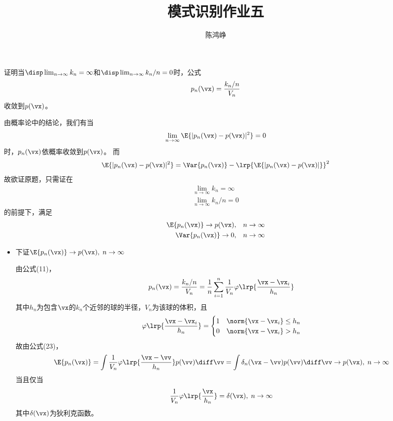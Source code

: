 \documentclass[reportComp]{thesis}
\title{模式识别作业五}
\author{陈鸿峥}
\begin{document}
\maketitle

\begin{question}[\textsection 4 Q5]
证明当$\disp\lim_{n\to\infty}k_n=\infty$和$\disp\lim_{n\to\infty}k_n/n=0$时，公式
\[p_n(\vx)=\frac{k_n/n}{V_n}\]
收敛到$p(\vx)$。
\end{question}
\begin{answer}
由概率论中的结论，我们有当
\[\lim_{n\to \infty}\E{|p_n(\vx)-p(\vx)|^2}=0\]
时，$p_n(\vx)$依概率收敛到$p(\vx)$。
而
\[\E{|p_n(\vx)-p(\vx)|^2}=\Var{p_n(\vx)}-\lrp{\E{|p_n(\vx)-p(\vx)|}}^2\]
故欲证原题，只需证在
\[\begin{aligned}
\lim_{n\to\infty}k_n=\infty\\
\lim_{n\to\infty}k_n/n=0
\end{aligned}\]
的前提下，满足
\[\begin{aligned}
\E{p_n(\vx)}\to p(\vx), & \quad n\to\infty\\
\Var{p_n(\vx)}\to 0, & \quad n\to\infty
\end{aligned}\]

\begin{itemize}
	\item 下证$\E{p_n(\vx)}\to p(\vx),\;n\to\infty$\par
由公式(11)，
\[p_n(\vx)=\frac{k_n/n}{V_n}=\frac{1}{n}\sum_{i=1}^n\frac{1}{V_n}\varphi\lrp{\frac{\vx-\vx_i}{h_n}}\]
其中$h_n$为包含$\vx$的$k_n$个近邻的球的半径，$V_n$为该球的体积，且
\[\varphi\lrp{\frac{\vx-\vx_i}{h_n}}=\begin{cases}
1 & \norm{\vx-\vx_i}\leq h_n\\
0 & \norm{\vx-\vx_i}>h_n
\end{cases}\]
故由公式(23)，
\[\E{p_n(\vx)}=\int\frac{1}{V_n}\varphi\lrp{\frac{\vx-\vv}{h_n}}p(\vv)\diff\vv
=\int\delta_n(\vx-\vv)p(\vv)\diff\vv\to p(\vx),\;n\to\infty\]
当且仅当
\[\frac{1}{V_n}\varphi\lrp{\frac{\vx}{h_n}}=\delta(\vx),\;n\to\infty\]
其中$\delta(\vx)$为狄利克函数。


\end{itemize}
\end{answer}
\end{document}
